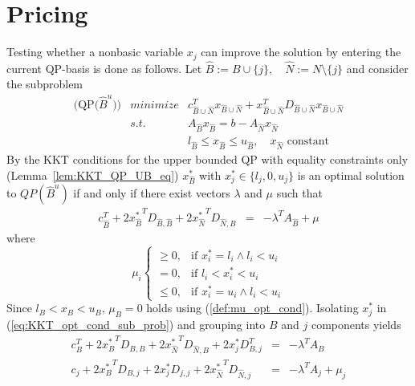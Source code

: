 \documentclass[a4paper]{article}
\begin{document}
\section{Pricing}
Testing whether a nonbasic variable $x_{j}$
can improve the solution by entering the current QP-basis is done as follows.
Let $\hat{B}:=B \cup \{j\}, \quad \hat{N}:=N \setminus \{j\}$ and consider the
subproblem
\begin{eqnarray}
  \mbox{(QP($\hat{B}^{u}$))} &minimize& c_{\hat{B} \cup \hat{N}}^{T}
    x_{\hat{B} \cup \hat{N}} +
    x_{\hat{B} \cup \hat{N}}^{T}
    D_{\hat{B} \cup \hat{N}}x_{\hat{B} \cup \hat{N}}
\nonumber      \\
\label{eq:QP_UB_sub_feas_cons}
    & s.t. & A_{\hat{B}}x_{\hat{B}} = b - A_{\hat{N}}
    x_{\hat{N}}  \\
\label{eq:QP_UB_sub_var_feas_cons}
    & & l_{\hat{B}} \leq x_{\hat{B}} \leq u_{\hat{B}},
    \quad x_{\hat{N}} \text{ constant}  
\end{eqnarray}
By the KKT conditions for the upper bounded QP with equality constraints only (Lemma~\ref{lem:KKT_QP_UB_eq}) $x_{\hat{B}}^{*}$ with
$x_{j}^{*} \in \{l_{j}, 0, u_{j}\}$
is an optimal solution to $QP(\hat{B}^{u})$ if and only if there exist vectors
$\lambda$ and $\mu$ such that
\begin{eqnarray}
\label{eq:KKT_opt_cond_sub_prob}
c_{\hat{B}}^{T}+2{x_{\hat{B}}^{*}}^{T}D_{\hat{B}, \hat{B}}
+2{x_{\hat{N}}^{*}}^{T}D_{\hat{N}, \hat{B}}
& = &
-\lambda^{T}A_{\hat{B}}+\mu 
\end{eqnarray}
where
\begin{equation}
\label{eq:KKT_opt_cond_sub_prob_mu}
\mu_{i}
\left\{
\begin{array}{ll}
\geq 0,
&
\text{if $x_{i}^{*}=l_{i} \wedge l_{i} < u_{i}$} \\
=0,
&
\text{if $l_{i} < x_{i}^{*} < u_{i}$} \\
\leq 0,
&
\text{if $x_{i}^{*}=u_{i} \wedge l_{i} < u_{i}$}
\end{array}
\right.
\end{equation}
Since $l_{B} < x_{B} < u_{B}$, $\mu_{B}=0$ holds using (\ref{def:mu_opt_cond}).
Isolating $x_{j}^{*}$ in (\ref{eq:KKT_opt_cond_sub_prob}) and grouping into $B$
and $j$ components yields
\begin{eqnarray}
\label{eq:KKT_lagrange_id_B}
  c_{B}^{T} + {2x_{B}^{*}}^{T}D_{B,B}
  + 2{x_{\hat{N}}^{*}}^{T}D_{\hat{N},B}
  + 2x_{j}^{*}D_{B,j}^{T} & = & -\lambda^{T} A_{B} \\
\label{eq:KKT_lagrange_id_j}
  c_{j} + 2{x_{B}^{*}}^{T}D_{B,j}
  + 2x_{j}^{*}D_{j,j}
  + 2{x_{\hat{N}}^{*}}^{T}D_{\hat{N},j} & = &
  -\lambda^{T} A_{j} + \mu_{j}
\end{eqnarray}
\end{document}
